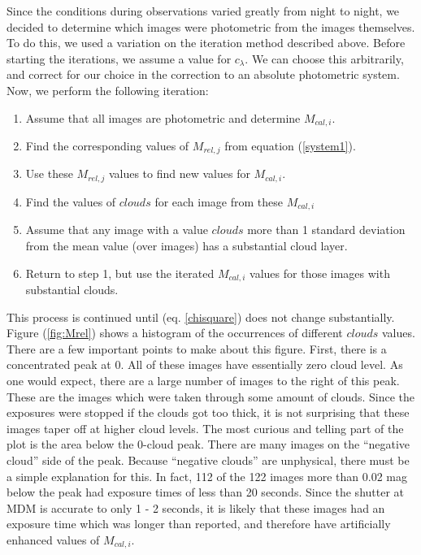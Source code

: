 \documentclass{article}
\begin{document}
        Since the conditions during observations varied greatly from
night to night, we decided to determine which images were photometric
from the images themselves.  To do this, we used a variation on the
iteration method described above.  Before starting the iterations, we
assume a value for $c_{\lambda}$.  We can choose this arbitrarily, and
correct for our choice in the correction to an absolute photometric
system.  Now, we perform the following iteration:

\begin{enumerate}
\setlength{\parskip}{-0.05in}
\item Assume that all images are photometric and determine $M_{cal,i}$.
\item Find the corresponding values of $M_{rel,j}$ from equation (\ref{system1}).
\item Use these $M_{rel,j}$ values to find new values for $M_{cal,i}$.
\item Find the values of $clouds$ for each image from these $M_{cal,i}$
\item Assume that any image with a value $clouds$ more than 1 standard
deviation from the mean value (over images) has a substantial cloud
layer.  
\item Return to step 1, but use the iterated $M_{cal,i}$ values for those
images with substantial clouds.
\end{enumerate}
This process is continued until \chisq (eq. \ref{chisquare}) does not
change substantially.  Figure (\ref{fig:Mrel}) shows a histogram of
the occurrences of different $clouds$ values.  There are a few
important points to make about this figure.  First, there is a
concentrated peak at 0.  All of these images have essentially zero
cloud level.  As one would expect, there are a large number of images
to the right of this peak.  These are the images which were taken
through some amount of clouds.  Since the exposures were stopped if
the clouds got too thick, it is not surprising that these images taper
off at higher cloud levels.  The most curious and telling part of the
plot is the area below the 0-cloud peak.  There are many images on the
``negative cloud'' side of the peak.  Because ``negative clouds'' are
unphysical, there must be a simple explanation for this.  In fact, 112
of the 122 images more than 0.02 mag below the peak had exposure times
of less than 20 seconds.  Since the shutter at MDM is accurate to only
1 - 2 seconds, it is likely that these images had an exposure time
which was longer than reported, and therefore have artificially
enhanced values of $M_{cal,i}$.
\end{document}
